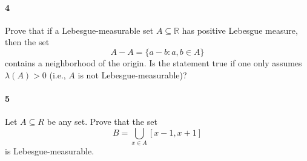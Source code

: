 \documentclass[12pt]{article}
\newlength{\myparskip}
\newenvironment{fullbox}{\begin{lrbox}{\savefullbox}\begin{minipage}{\dimexpr\textwidth-2\fboxsep\relax}\setlength{\parskip}{\myparskip}}{\end{minipage}\end{lrbox}\framebox[\textwidth]{\usebox{\savefullbox}}}
\newenvironment{pbox}[1][]{\begin{fullbox}\ifx#1\empty\else\paragraph{#1}\fi}{\end{fullbox}}
\newcommand{\R}{\mathbb{R}}
\newcommand{\<}{\langle}
\renewcommand{\>}{\rangle}
\begin{document}
\begin{pbox}[4]
    Prove that if a Lebesgue-measurable set $A \subseteq \R$ has positive Lebesgue measure, then the set
    \[
        A - A = \{a - b : a, b \in A\}
    \]
    contains a neighborhood of the origin. Is the statement true if one only assumes $\lambda(A) > 0$ (i.e., $A$ is not Lebesgue-measurable)?
\end{pbox}



\begin{pbox}[5]
    Let $A \subseteq R$ be any set. Prove that the set
    \[
        B = \bigcup_{x \in A} [x - 1, x + 1]
    \]
    is Lebesgue-measurable.
\end{pbox}
\end{document}
